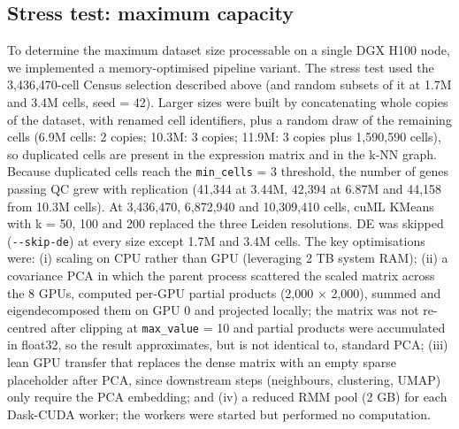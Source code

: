 \documentclass[runningheads]{llncs}
\begin{document}
\hypertarget{stress-test-maximum-capacity}{%
\subsection{Stress test: maximum capacity}\label{stress-test-maximum-capacity}}

To determine the maximum dataset size processable on a single DGX H100 node, we implemented a memory-optimised pipeline variant. The stress test used the 3,436,470-cell Census selection described above (and random subsets of it at 1.7M and 3.4M cells, seed = 42). Larger sizes were built by concatenating whole copies of the dataset, with renamed cell identifiers, plus a random draw of the remaining cells (6.9M cells: 2 copies; 10.3M: 3 copies; 11.9M: 3 copies plus 1,590,590 cells), so duplicated cells are present in the expression matrix and in the k-NN graph. Because duplicated cells reach the \texttt{min\_\allowbreak{}cells} = 3 threshold, the number of genes passing QC grew with replication (41,344 at 3.44M, 42,394 at 6.87M and 44,158 from 10.3M cells). At 3,436,470, 6,872,940 and 10,309,410 cells, cuML KMeans with k = 50, 100 and 200 replaced the three Leiden resolutions. DE was skipped (\texttt{-\/-skip-de}) at every size except 1.7M and 3.4M cells.
The key optimisations were: (i) scaling on CPU rather than GPU (leveraging 2 TB system RAM); (ii) a covariance PCA in which the parent process scattered the scaled matrix across the 8 GPUs, computed per-GPU partial products (2,000 $\times$ 2,000), summed and eigendecomposed them on GPU 0 and projected locally; the matrix was not re-centred after clipping at \texttt{max\_\allowbreak{}value} = 10 and partial products were accumulated in float32, so the result approximates, but is not identical to, standard PCA; (iii) lean GPU transfer that replaces the dense matrix with an empty sparse placeholder after PCA, since downstream steps (neighbours, clustering, UMAP) only require the PCA embedding; and (iv) a reduced RMM pool (2 GB) for each Dask-CUDA worker; the workers were started but performed no computation.
\end{document}
